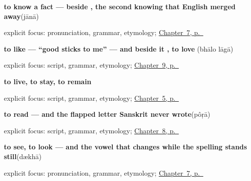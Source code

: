 \noindent\begin{minipage}[t]{\linewidth}
\raggedright
\textbf{to know a fact — beside , the second knowing that English merged away}\enspace\emph{}\enspace(jānā)\par
\footnotesize explicit focus: pronunciation, grammar, etymology; \hyperref[ch:bn-core-verbs]{Chapter~7, p.~\pageref*{ch:bn-core-verbs}}
\end{minipage}\par\smallskip

\noindent\begin{minipage}[t]{\linewidth}
\raggedright
\textbf{to like — \textquotedblleft{}good sticks to me\textquotedblright{} — and beside it , to love}\enspace\emph{ }\enspace(bhālo lāgā)\par
\footnotesize explicit focus: script, grammar, etymology; \hyperref[ch:bn-conjunct-verbs]{Chapter~9, p.~\pageref*{ch:bn-conjunct-verbs}}
\end{minipage}\par\smallskip

\noindent\begin{minipage}[t]{\linewidth}
\raggedright
\textbf{to live, to stay, to remain}\enspace\emph{}\par
\footnotesize explicit focus: script, grammar, etymology; \hyperref[ch:first-verbs]{Chapter~5, p.~\pageref*{ch:first-verbs}}
\end{minipage}\par\smallskip

\noindent\begin{minipage}[t]{\linewidth}
\raggedright
\textbf{to read — and the flapped letter Sanskrit never wrote}\enspace\emph{}\enspace(pôṛā)\par
\footnotesize explicit focus: script, grammar, etymology; \hyperref[ch:bn-mind-and-page]{Chapter~8, p.~\pageref*{ch:bn-mind-and-page}}
\end{minipage}\par\smallskip

\noindent\begin{minipage}[t]{\linewidth}
\raggedright
\textbf{to see, to look — and the vowel that changes while the spelling stands still}\enspace\emph{}\enspace(dækhā)\par
\footnotesize explicit focus: pronunciation, grammar, etymology; \hyperref[ch:bn-core-verbs]{Chapter~7, p.~\pageref*{ch:bn-core-verbs}}
\end{minipage}\par\smallskip

